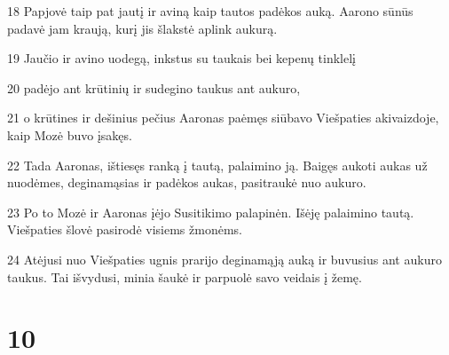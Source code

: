 \par 18 Papjovė taip pat jautį ir aviną kaip tautos padėkos auką. Aarono sūnūs padavė jam kraują, kurį jis šlakstė aplink aukurą. 
\par 19 Jaučio ir avino uodegą, inkstus su taukais bei kepenų tinklelį 
\par 20 padėjo ant krūtinių ir sudegino taukus ant aukuro, 
\par 21 o krūtines ir dešinius pečius Aaronas paėmęs siūbavo Viešpaties akivaizdoje, kaip Mozė buvo įsakęs. 
\par 22 Tada Aaronas, ištiesęs ranką į tautą, palaimino ją. Baigęs aukoti aukas už nuodėmes, deginamąsias ir padėkos aukas, pasitraukė nuo aukuro. 
\par 23 Po to Mozė ir Aaronas įėjo Susitikimo palapinėn. Išėję palaimino tautą. Viešpaties šlovė pasirodė visiems žmonėms. 
\par 24 Atėjusi nuo Viešpaties ugnis prarijo deginamąją auką ir buvusius ant aukuro taukus. Tai išvydusi, minia šaukė ir parpuolė savo veidais į žemę.



\chapter{10}


